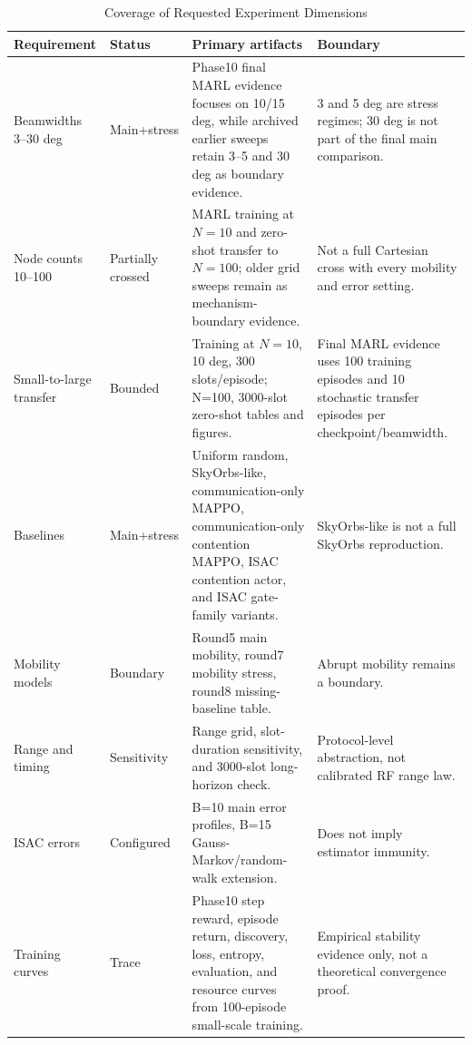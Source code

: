 \documentclass[journal]{IEEEtran}
\begin{document}
\begin{table}[!t]
  \centering
  \caption{Coverage of Requested Experiment Dimensions}
  \label{tab:supp_coverage}
  \scriptsize
  \setlength{\tabcolsep}{3pt}
  \begin{tabular}{p{}p{}p{}p{}}
    \toprule
    Requirement & Status & Primary artifacts & Boundary \\
    \midrule
    Beamwidths 3--30 deg & Main+stress & Phase10 final MARL evidence focuses on 10/15 deg, while archived earlier sweeps retain 3--5 and 30 deg as boundary evidence. & 3 and 5 deg are stress regimes; 30 deg is not part of the final main comparison. \\
    Node counts 10--100 & Partially crossed & MARL training at $N=10$ and zero-shot transfer to $N=100$; older grid sweeps remain as mechanism-boundary evidence. & Not a full Cartesian cross with every mobility and error setting. \\
    Small-to-large transfer & Bounded & Training at $N=10$, 10 deg, 300 slots/episode; N=100, 3000-slot zero-shot tables and figures. & Final MARL evidence uses 100 training episodes and 10 stochastic transfer episodes per checkpoint/beamwidth. \\
    Baselines & Main+stress & Uniform random, SkyOrbs-like, communication-only MAPPO, communication-only contention MAPPO, ISAC contention actor, and ISAC gate-family variants. & SkyOrbs-like is not a full SkyOrbs reproduction. \\
    Mobility models & Boundary & Round5 main mobility, round7 mobility stress, round8 missing-baseline table. & Abrupt mobility remains a boundary. \\
    Range and timing & Sensitivity & Range grid, slot-duration sensitivity, and 3000-slot long-horizon check. & Protocol-level abstraction, not calibrated RF range law. \\
    ISAC errors & Configured & B=10 main error profiles, B=15 Gauss-Markov/random-walk extension. & Does not imply estimator immunity. \\
    Training curves & Trace & Phase10 step reward, episode return, discovery, loss, entropy, evaluation, and resource curves from 100-episode small-scale training. & Empirical stability evidence only, not a theoretical convergence proof. \\
    \bottomrule
  \end{tabular}
\end{table}
\end{document}
